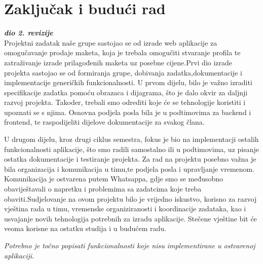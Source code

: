 \chapter{Zaključak i budući rad}
		
		\textbf{\textit{dio 2. revizije}}\\
		
		 \noindent Projektni zadatak naše grupe sastojao se od izrade web aplikacije za omogučavanje prodaje maketa, koja je trebala omogučiti stvaranje profila te zatraživanje izrade prilagođenih maketa uz posebne cijene.Prvi dio izrade projekta sastojao se od formiranja grupe, dobivanja zadatka,dokumentacije i implementacije generičkih funkcionalnosti. U prvom dijelu, bilo je važno izraditi specifikacije zadatka pomoću obrazaca i dijagrama, što je dalo okvir za daljnji razvoj projekta. Takoder, trebali smo odrediti koje će se tehnologije koristiti i upoznati se s njima. Osnovna podjela posla bila je u podtimovima za backend i frontend, te raspodijeliti dijelove dokumentacije za svakog člana.

		\noindent U drugom dijelu, kroz drugi ciklus semestra, fokus je bio na implementacji ostalih funkcionalnosti aplikacije, što smo radili samostalno ili u podtimovima, uz pisanje ostatka dokumentacije i testiranje projekta. Za rad na projektu posebno važna je bila organizacija i komunikacija u timu,te podjela posla i upravljanje vremenom. Komunikacija je ostvarena putem Whatsappa, gdje smo se međusobno obaviještavali o napretku i problemima sa zadatcima koje treba obaviti.Sudjelovanje na ovom projektu bilo je vrijedno iskustvo, korisno za razvoj vještina rada u timu, vremenske organiziranosti i koordinacije zadataka, kao i usvajanje novih tehnologija potrebnih za izradu aplikacije. Stečene vještine bit će veoma korisne na ostatku studija i u budućem radu.

		
		 \textit{Potrebno je točno popisati funkcionalnosti koje nisu implementirane u ostvarenoj aplikaciji.}
		
		\eject 